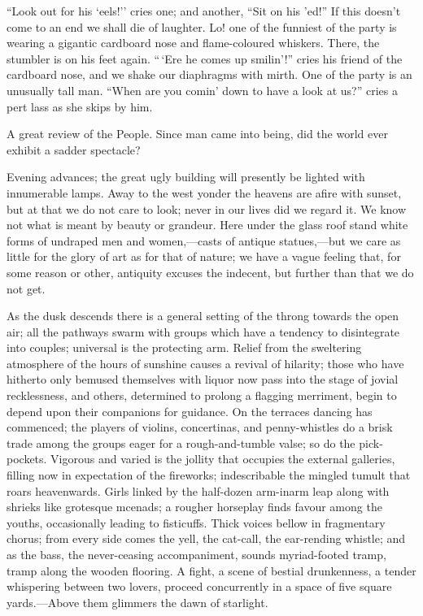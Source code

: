 ``Look out for his `eels!'' cries one; and another, ``Sit on his 'ed!''
If this doesn't come to an end we shall die of laughter. Lo! one of the
funniest of the party is wearing a gigantic cardboard nose and
flame-coloured whiskers. There, the stumbler is on his feet again.
``\,`Ere he comes up smilin'!'' cries his friend of the cardboard nose,
and we shake our diaphragms with mirth. One of the party is an unusually
tall man. ``When are you comin' down to have a look at us?'' cries a
pert lass as she skips by him.

A great review of the People. Since man came into being, did the world
ever exhibit a sadder spectacle?

Evening advances; the great ugly building will presently be lighted with
innumerable lamps. Away to the west yonder the heavens are afire with
sunset, but at that we do not care to look; never in our lives did we
regard it. We know not what is meant by beauty
{\protect\hypertarget{268}{}{}}or grandeur. Here under the glass roof
stand white forms of undraped men and women,---casts of antique
statues,---but we care as little for the glory of art as for that of
nature; we have a vague feeling that, for some reason or other,
antiquity excuses the indecent, but further than that we do not get.

As the dusk descends there is a general setting of the throng towards
the open air; all the pathways swarm with groups which have a tendency
to disintegrate into couples; universal is the protecting arm. Relief
from the sweltering atmosphere of the hours of sunshine causes a revival
of hilarity; those who have hitherto only bemused themselves with liquor
now pass into the stage of jovial recklessness, and others, determined
to prolong a flagging merriment, begin to depend upon their companions
for guidance. On the terraces dancing has commenced; the players of
violins, concertinas, and penny-whistles do a brisk trade among the
groups eager for a rough-and-tumble valse; so do the
{\protect\hypertarget{269}{}{}}pick-pockets. Vigorous and varied is the
jollity that occupies the external galleries, filling now in expectation
of the fireworks; indescribable the mingled tumult that roars
heavenwards. Girls linked by the half-dozen arm-inarm leap along with
shrieks like grotesque mcenads; a rougher horseplay finds favour among
the youths, occasionally leading to fisticuffs. Thick voices bellow in
fragmentary chorus; from every side comes the yell, the cat-call, the
ear-rending whistle; and as the bass, the never-ceasing accompaniment,
sounds myriad-footed tramp, tramp along the wooden flooring. A fight, a
scene of bestial drunkenness, a tender whispering between two lovers,
proceed concurrently in a space of five square yards.---Above them
glimmers the dawn of starlight.

